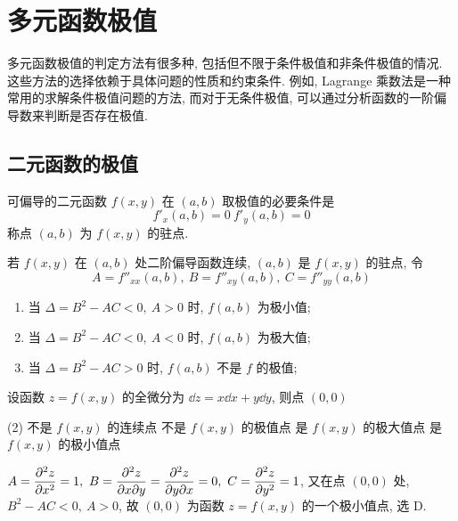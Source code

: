 \section{多元函数极值}

多元函数极值的判定方法有很多种, 包括但不限于条件极值和非条件极值的情况. 这些方法的选择依赖于具体问题的性质和约束条件. 例如, Lagrange 乘数法是一种常用的求解条件极值问题的方法, 而对于无条件极值, 可以通过分析函数的一阶偏导数来判断是否存在极值. 

\subsection{二元函数的极值}

\begin{theorem}[二元函数取极值的必要条件]
    可偏导的二元函数 $f(x,y)$ 在 $(a,b)$ 取极值的必要条件是
    $$f'_x(a,b)=0~  f'_y(a,b)=0$$
    称点 $(a,b)$ 为 $f(x,y)$ 的驻点.
\end{theorem}

\begin{theorem}[二元函数取极值的充分条件]
    若 $f(x,y)$ 在 $(a,b)$ 处二阶偏导函数连续, $(a,b)$ 是 $f(x,y)$ 的驻点, 令
    $$A=f''_{xx}(a,b),~  B=f''_{xy}(a,b),~  C=f''_{yy}(a,b)$$
    \begin{enumerate}[label=(\arabic{*})]
        \item 当 $\Delta=B^2-AC<0,~A>0$ 时, $f(a,b)$ 为极小值;
        \item 当 $\Delta=B^2-AC<0,~A<0$ 时, $f(a,b)$ 为极大值;
        \item 当 $\Delta=B^2-AC>0$ 时, $f(a,b)$ 不是 $f$ 的极值;
    \end{enumerate}
\end{theorem}

\begin{example}[2009 数二]
    设函数 $z=f(x,y)$ 的全微分为 $\dd z=x\dd x+y\dd y$, 则点 $(0,0)$
    \begin{tasks}(2)
        \task 不是 $f(x,y)$ 的连续点
        \task 不是 $f(x,y)$ 的极值点
        \task 是 $f(x,y)$ 的极大值点
        \task 是 $f(x,y)$ 的极小值点
    \end{tasks}
\end{example}
\begin{solution}
    $\displaystyle A=\pdv[2]{z}{x}=1,~B=\pdv{z}{x}{y}=\pdv{z}{y}{x}=0,~C=\pdv[2]{z}{y}=1$, 又在点 $(0,0)$ 处, $B^2-AC<0,~A>0$, 故 $(0,0)$ 为函数 $z=f(x,y)$ 的一个极小值点, 选 D.
\end{solution}

